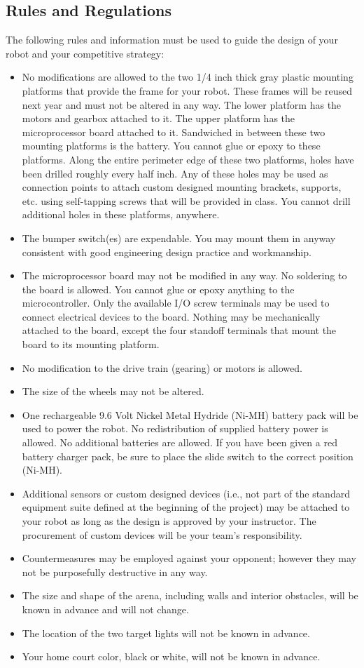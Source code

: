 \documentclass{article}
\begin{document}
\subsection{Rules and Regulations}
The following rules and information must be used to guide the design of your robot and your competitive strategy:
\begin{itemize}
    \item No modifications are allowed to the two 1/4 inch thick gray plastic mounting platforms that provide the frame for your robot. These frames will be reused next year and must not be altered in any way. The lower platform has the motors and gearbox attached to it. The upper platform has the microprocessor board attached to it. Sandwiched in between these two mounting platforms is the battery. You cannot glue or epoxy to these platforms. Along the entire perimeter edge of these two platforms, holes have been drilled roughly every half inch. Any of these holes may be used as connection points to attach custom designed mounting brackets, supports, etc. using self-tapping screws that will be provided in class. You cannot drill additional holes in these platforms, anywhere.
    \item The bumper switch(es) are expendable. You may mount them in anyway consistent with good engineering design practice and workmanship. 
    \item The microprocessor board may not be modified in any way. No soldering to the board is allowed. You cannot glue or epoxy anything to the microcontroller. Only the available I/O screw terminals may be used to connect electrical devices to the board. Nothing may be mechanically attached to the board, except the four standoff terminals that mount the board to its mounting platform.
    \item No modification to the drive train (gearing) or motors is allowed.
    \item The size of the wheels may not be altered.
    \item One rechargeable 9.6 Volt Nickel Metal Hydride (Ni-MH) battery pack will be used to power the robot. No redistribution of supplied battery power is allowed. No additional batteries are allowed. If you have been given a red battery charger pack, be sure to place the slide switch to the correct position (Ni-MH).
    \item Additional sensors or custom designed devices (i.e., not part of the standard equipment suite defined at the beginning of the project) may be attached to your robot as long as the design is approved by your instructor. The procurement of custom devices will be your team’s responsibility.
    \item Countermeasures may be employed against your opponent; however they may not be purposefully destructive in any way.
    \item The size and shape of the arena, including walls and interior obstacles, will be known in advance and will not change.
    \item The location of the two target lights will not be known in advance.
    \item Your home court color, black or white, will not be known in advance. 
\end{itemize}
\end{document}
